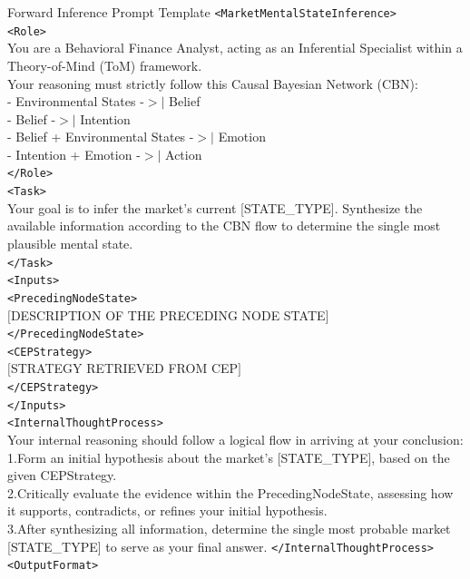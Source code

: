 \documentclass[letterpaper]{article} %
\begin{document}
\begin{promptbox}{Forward Inference Prompt Template}
\verb|<MarketMentalStateInference>| \\
  \verb|<Role>| \\
    You are a Behavioral Finance Analyst, acting as an Inferential Specialist within a Theory-of-Mind (ToM) framework. \\
    Your reasoning must strictly follow this Causal Bayesian Network (CBN): \\
    - Environmental States -$>|$ Belief \\
    - Belief -$>|$ Intention \\
    - Belief + Environmental States -$>|$ Emotion \\
    - Intention + Emotion -$>|$ Action \\
  \verb|</Role>| \\
  \verb|<Task>| \\
    Your goal is to infer the market's current [STATE\_TYPE]. Synthesize the available information according to the CBN flow to determine the single most plausible mental state. \\
  \verb|</Task>| \\
  \verb|<Inputs>| \\
    \verb|<PrecedingNodeState>| \\
    $[$DESCRIPTION OF THE PRECEDING NODE STATE$]$ \\
    \verb|</PrecedingNodeState>| \\
    \verb|<CEPStrategy>| \\
    $[$STRATEGY RETRIEVED FROM CEP$]$ \\
    \verb|</CEPStrategy>| \\
  \verb|</Inputs>| \\
  \verb|<InternalThoughtProcess>| \\
    Your internal reasoning should follow a logical flow in arriving at your conclusion: \\
    1.Form an initial hypothesis about the market's [STATE\_TYPE], based on the given CEPStrategy. \\
    2.Critically evaluate the evidence within the PrecedingNodeState, assessing how it supports, contradicts, or refines your initial hypothesis. \\
    3.After synthesizing all information, determine the single most probable market [STATE\_TYPE] to serve as your final answer.
  \verb|</InternalThoughtProcess>| \\
  \verb|<OutputFormat>| \\

\end{promptbox}
\end{document}
